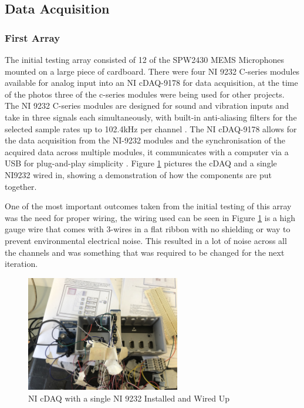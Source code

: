 \documentclass{UoNMCHA}
\numberwithin{equation}{section}
\begin{document}
\subsection{Data Acquisition} \label{sec:DAQ}

\subsubsection{First Array} \label{sec:First Design DAQ}
    The initial testing array consisted of 12 of the SPW2430 MEMS Microphones mounted on a large piece of cardboard. There were four NI 9232 C-series modules available for analog input into an NI cDAQ-9178 for data acquisition, at the time of the photos three of the c-series modules were being used for other projects. The NI 9232 C-series modules are designed for sound and vibration inputs and take in three signals each simultaneously, with built-in anti-aliasing filters for the selected sample rates up to 102.4kHz per channel \citep{NI9232}. The NI cDAQ-9178 allows for the data acquisition from the NI-9232 modules and the synchronisation of the acquired data across multiple modules, it communicates with a computer via a USB for plug-and-play simplicity \citep{cDAQ9178}. Figure \ref{fig:TestSetup} pictures the cDAQ and a single NI9232 wired in, showing a demonstration of how the components are put together.

    One of the most important outcomes taken from the initial testing of this array was the need for proper wiring, the wiring used can be seen in Figure \ref{fig:TestSetup} is a high gauge wire that comes with 3-wires in a flat ribbon with no shielding or way to prevent environmental electrical noise. This resulted in a lot of noise across all the channels and was something that was required to be changed for the next iteration.

    \begin{figure} [H]
        \centering
        \includegraphics[keepaspectratio, width = 0.6\textwidth]{Figures/cDAQ.jpg}
        \caption{NI cDAQ with a single NI 9232 Installed and Wired Up}
        \label{fig:TestSetup}
    \end{figure}
\end{document}
